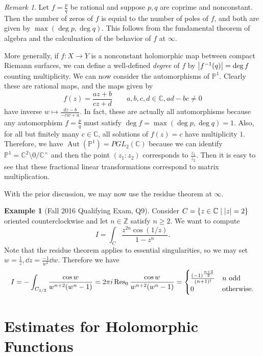 \documentclass[leqno, openany]{memoir}
\theoremstyle{definition}
\newtheorem{exm}[thm]{Example}
\theoremstyle{remark}
\newtheorem{rmk}[thm]{Remark}
\theoremstyle{plain}
\theoremstyle{definition}
\theoremstyle{remark}
\newcommand{\C}{\mathbb{C}}
\newcommand{\Z}{\mathbb{Z}}
\renewcommand{\P}{\mathbb{P}}
\DeclareMathOperator{\Aut}{Aut}
\begin{document}
\begin{rmk} Let $f = \frac{p}{q}$ be rational and suppose $p,q$ are coprime and
    nonconstant. Then the number of zeros of $f$ is equial to the number of
    poles of $f$, and both are given by $\max (\deg p, \deg q)$. This follows
    from the fundamental theorem of algebra and the calculuation of the
    behavior of $f$ at $\infty$.  \end{rmk}

More generally, if $f \colon X \to Y$ is a nonconstant holomorphic map between
compact Riemann surfaces, we can define a well-defined \textit{degree} of $f$
by $\abs{f^{-1}(q)} = \deg f$ counting multiplicity. We can now consider the
automorphisms of $\P^1$. Clearly these are rational maps, and the maps given by
\[ f(z) = \frac{az + b}{cz + d} \qquad a,b,c,d \in \C, ad-bc \neq 0 \] have
inverse $w \mapsto \frac{dz - b}{-cw + a}$. In fact, these are actually all
automorphisms because any automorphism $f = \frac{p}{q}$ must satisfy $\deg f =
\max (\deg p, \deg q) = 1$. Also, for all but finitely many $c \in \C$, all
solutions of $f(z) = c$ have multiplicity $1$. Therefore, we have $\Aut(\P^1) =
PGL_2(\C)$ because we can identify $\P^1 = \C^2 \setminus \qty{0} /
\C^{\times}$ and then the point $(z_1 : z_2)$ corresponds to $\frac{z_1}{z_2}$.
Then it is easy to see that these fractional linear transformations correspond
to matrix multiplication.

With the prior discussion, we may now use the residue theorem at $\infty$.
\begin{exm}[Fall 2016 Qualifying Exam, Q9] Consider $C = \qty{z \in \C \mid
    \abs{z} = 2}$ oriented counterclockwise and let $n \in \Z$ satisfy $n \geq
    2$. We want to compute \[ I = \int_C \frac{z^{2n} \cos(1/z)}{1-z^n}. \]
    Note that the residue theorem applies to essential singularities, so we may
    set $w = \frac{1}{z}, \dd{z} = \frac{-1}{w^2} \dd{w}$. Therefore we have \[
        I = - \int_{C_{1/2}} \frac{\cos w}{w^{n+2}(w^n - 1)} = 2 \pi i \Res_0
        \frac{\cos w}{w^{n+2}(w^n - 1)} = \begin{cases}
        \frac{{(-1)}^{\frac{n+3}{2}}}{(n+1)!} & n \text{ odd} \\ 0 &
    \text{otherwise}.  \end{cases} \] \end{exm}

\section{Estimates for Holomorphic Functions}%
\label{sec:estimates_for_holomorphic_functions}
\end{document}
